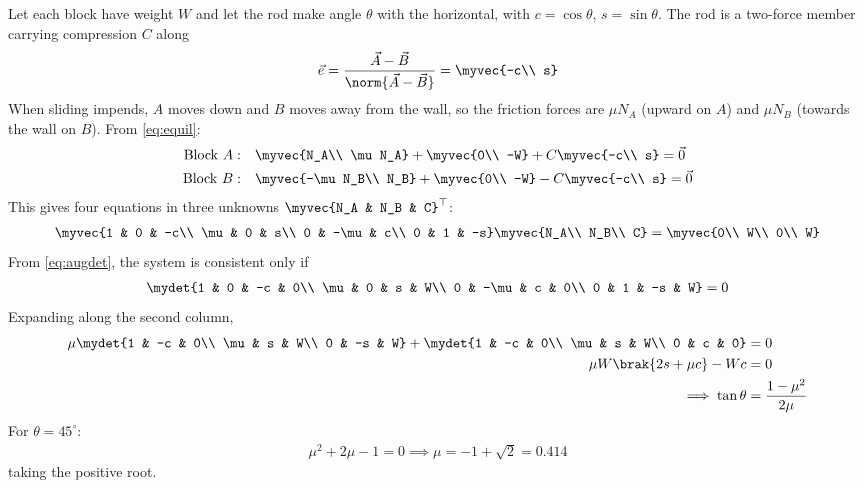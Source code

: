 \begin{enumerate}[label=\thesubsection.\arabic*, ref=\thesubsection.\theenumi, itemsep=0pt, leftmargin=*]
\solution Let each block have weight $W$ and let the rod make angle $\theta$ with the horizontal, with $c = \cos\theta$, $s = \sin\theta$. The rod is a two-force member carrying compression $C$ along
\begin{align}
\vec{e} = \frac{\vec{A} - \vec{B}}{\norm{\vec{A} - \vec{B}}} = \myvec{-c\\ s}
\end{align}
When sliding impends, $A$ moves down and $B$ moves away from the wall, so the friction forces are $\mu N_A$ (upward on $A$) and $\mu N_B$ (towards the wall on $B$). From \eqref{eq:equil}:
\begin{align}
\text{Block }A:&\quad \myvec{N_A\\ \mu N_A} + \myvec{0\\ -W} + C\myvec{-c\\ s} = \vec{0}\\
\text{Block }B:&\quad \myvec{-\mu N_B\\ N_B} + \myvec{0\\ -W} - C\myvec{-c\\ s} = \vec{0}
\end{align}
This gives four equations in three unknowns $\myvec{N_A & N_B & C}^\top$:
\begin{align}
\myvec{1 & 0 & -c\\ \mu & 0 & s\\ 0 & -\mu & c\\ 0 & 1 & -s}\myvec{N_A\\ N_B\\ C} = \myvec{0\\ W\\ 0\\ W}
\end{align}
From \eqref{eq:augdet}, the system is consistent only if
\begin{align}
\mydet{1 & 0 & -c & 0\\ \mu & 0 & s & W\\ 0 & -\mu & c & 0\\ 0 & 1 & -s & W} = 0
\end{align}
Expanding along the second column,
\begin{align}
\mu\mydet{1 & -c & 0\\ \mu & s & W\\ 0 & -s & W} + \mydet{1 & -c & 0\\ \mu & s & W\\ 0 & c & 0} &= 0\\
\mu W\brak{2s + \mu c} - Wc &= 0\\
\implies \tan\theta &= \frac{1 - \mu^2}{2\mu}
\end{align}
For $\theta = 45^\circ$:
\begin{align}
\mu^2 + 2\mu - 1 = 0 \implies \mu = -1 + \sqrt{2} = 0.414
\end{align}
taking the positive root.


\end{enumerate}
